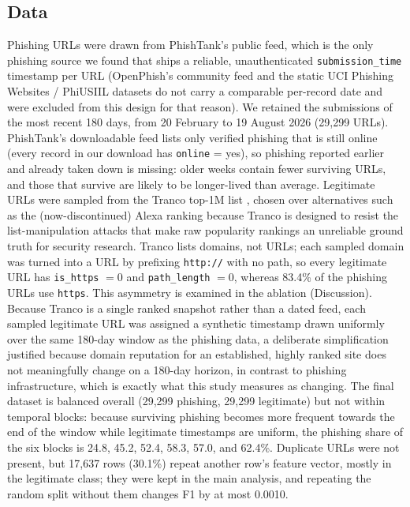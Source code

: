 \documentclass[10pt, a4paper, oneside]{article}
\begin{document}
\subsection{Data}
Phishing URLs were drawn from PhishTank's public feed, which is the only phishing source we found that ships a reliable, unauthenticated \texttt{submission\_time} timestamp per URL (OpenPhish's community feed and the static UCI Phishing Websites / PhiUSIIL datasets do not carry a comparable per-record date and were excluded from this design for that reason). We retained the submissions of the most recent 180 days, from 20 February to 19 August 2026 (29{,}299 URLs). PhishTank's downloadable feed lists only verified phishing that is still online (every record in our download has \texttt{online} = yes), so phishing reported earlier and already taken down is missing: older weeks contain fewer surviving URLs, and those that survive are likely to be longer-lived than average. Legitimate URLs were sampled from the Tranco top-1M list \cite{lepochat2019tranco} , chosen over alternatives such as the (now-discontinued) Alexa ranking because Tranco is designed to resist the list-manipulation attacks that make raw popularity rankings an unreliable ground truth for security research. Tranco lists domains, not URLs; each sampled domain was turned into a URL by prefixing \texttt{http://} with no path, so every legitimate URL has \texttt{is\_https} $=0$ and \texttt{path\_length} $=0$, whereas 83.4\% of the phishing URLs use \texttt{https}. This asymmetry is examined in the ablation (Discussion). Because Tranco is a single ranked snapshot rather than a dated feed, each sampled legitimate URL was assigned a synthetic timestamp drawn uniformly over the same 180-day window as the phishing data, a deliberate simplification justified because domain reputation for an established, highly ranked site does not meaningfully change on a 180-day horizon, in contrast to phishing infrastructure, which is exactly what this study measures as changing. The final dataset is balanced overall (29{,}299 phishing, 29{,}299 legitimate) but not within temporal blocks: because surviving phishing becomes more frequent towards the end of the window while legitimate timestamps are uniform, the phishing share of the six blocks is 24.8, 45.2, 52.4, 58.3, 57.0, and 62.4\%. Duplicate URLs were not present, but 17{,}637 rows (30.1\%) repeat another row's feature vector, mostly in the legitimate class; they were kept in the main analysis, and repeating the random split without them changes F1 by at most 0.0010.
\end{document}

